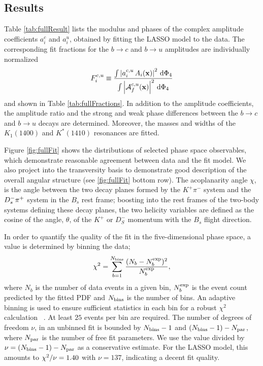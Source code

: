 \clearpage
\subsection{Results}

Table \ref{tab:fullResult} 
lists the modulus and phases of the complex amplitude coefficients $a^c_{i}$ and $a^u_{i}$, 
obtained by fitting the LASSO model to the data.
The corresponding fit fractions for the $b\to c$ and $b\to u$ amplitudes are individually normalized
\begin{equation}
\label{eq:DefineFitFractions}
	F^{c,u}_{i} \equiv \frac{\int \left\vert   a_{i}^{c,u} \, A_{i}(\mathbf{x}) \right\vert^{2} \, \text{d}\Phi_{4} }
	{\int \left\vert  \mathcal A_f^{c,u}(\mathbf{x}) \right\vert^{2} \, \text{d}\Phi_{4}}  
\end{equation}
and shown in Table \ref{tab:fullFractions}.
In addition to the amplitude coefficients, the amplitude ratio and the strong and weak phase differences between the $b\to c$ and $b\to u$ decays are determined.
Moreover, the masses and widths of the $K_1(1400)$ and $K^{*}(1410)$ resonances are fitted.

Figure \ref{fig:fullFit} shows the distributions of 
selected phase space observables, which demonstrate 
reasonable agreement between data and the fit model. 
We also project into the transversity basis to demonstrate good description of the overall angular structure (see \ref{fig:fullFit} bottom row).
The acoplanarity angle 
${\chi}$, is the angle between the two decay planes formed by 
the $K^+\pi^-$ system and the $D_s^- {{\pi}^+}$ system
in the $B_s$ rest frame; boosting into the rest frames of the two-body systems defining these decay planes,
the two helicity variables 
are defined as the cosine of the angle, ${\theta}$, 
of the $K^+$ or $D_S^-$ momentum with the $B_s$ flight direction.

In order to quantify the quality of the fit in the five-dimensional phase space,
a \chisq value is determined by binning the data;
\begin{equation}
	\chi^{2} = \sum_{b=1}^{N_{\rm bins}} \frac{(N_{b}-N_{b}^{\rm exp})^{2}}{N_{b}^{\rm exp}},
\end{equation}
where $N_{b}$ is the number of data events in a given bin, 
$N_{b}^{\rm exp}$ is the event count predicted by the fitted PDF
and $N_{\rm bins}$ is the number of bins.
An adaptive binning
is used to ensure sufficient statistics in each bin for a robust $\chi^{2}$ calculation ~\cite{KKpipi}.
At least $25$ events per bin are required.
The number of degrees of freedom $\nu$, in an unbinned fit is bounded by $N_{\rm bins}-1$ and $(N_{\rm bins}- 1) - N_{\rm par}$, 
where $N_{\rm par}$ is the number of free fit parameters.
We use the \chisq value divided by $\nu = (N_{\rm bins}-1) - N_{\rm par}$ as a conservative estimate.
For the LASSO model, this 
amounts to $\chi^2/\nu = 1.40$ with $\nu = 137$,
indicating a decent fit quality.

